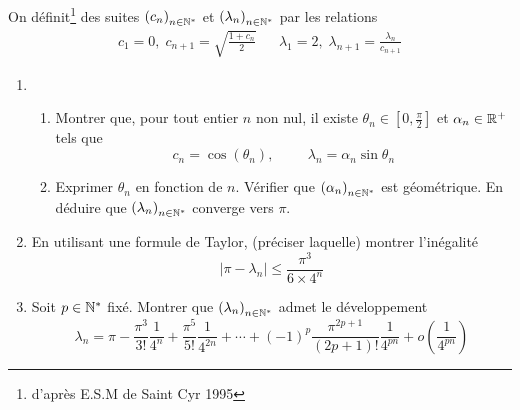 On définit\footnote{d'après E.S.M de Saint Cyr 1995} des suites $\left( c_n\right) _{n\in \mathbb{N}^*}$ et $\left( \lambda_n\right) _{n\in \mathbb{N}^*}$ par les relations
\begin{align*}
 c_1 = 0, \; c_{n+1}=\sqrt{\frac{1+c_n}{2}}
& &
\lambda_1 = 2,\; \lambda_{n+1} = \frac{\lambda_n}{c_{n+1}}
\end{align*}

\begin{enumerate}
 \item 
\begin{enumerate}
\item Montrer que, pour tout entier $n$ non nul, il existe $\theta_n\in [0,\frac{\pi}{2}]$ et $\alpha_n\in\mathbb{R}^+$ tels que
\begin{displaymath}
 c_n = \cos(\theta_n),\hspace{1cm} \lambda_n = \alpha_n \sin \theta_n
\end{displaymath}
\item Exprimer $\theta_n$ en fonction de $n$. Vérifier que $\left( \alpha_n\right) _{n\in \mathbb{N}^*}$ est géométrique. En déduire que $\left( \lambda_n\right) _{n\in \mathbb{N}^*}$ converge vers $\pi$.
\end{enumerate}
  
 \item En utilisant une formule de Taylor, (préciser laquelle) montrer l'inégalité
\begin{displaymath}
 |\pi - \lambda_n| \leq \frac{\pi^3}{6\times 4^n}
\end{displaymath}

 \item Soit $p\in \mathbb{N}^*$ fixé. Montrer que $\left( \lambda_n\right) _{n\in \mathbb{N}^*}$ admet le développement
\begin{displaymath}
 \lambda_n = \pi - \frac{\pi^3}{3!}\frac{1}{4^n} + \frac{\pi^5}{5!}\frac{1}{4^{2n}} +\cdots 
+(-1)^p\frac{\pi^{2p+1}}{(2p+1)!}\frac{1}{4^{pn}} + o(\frac{1}{4^{pn}})
\end{displaymath}


\end{enumerate}
